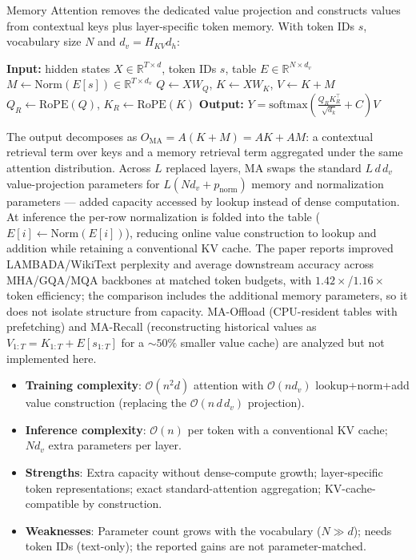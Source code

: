Memory Attention \citep{kang_memory_attention_2026} removes the dedicated value
projection and constructs values from contextual keys plus layer-specific
token memory. With token IDs $s$, vocabulary size $N$ and
$d_v = H_{KV} d_h$:

\begin{algorithmic}[1]
\State \textbf{Input:} hidden states $X \in \mathbb{R}^{T \times d}$, token IDs $s$, table $E \in \mathbb{R}^{N \times d_v}$
\State $M \gets \mathrm{Norm}(E[s]) \in \mathbb{R}^{T \times d_v}$ 
\State $Q \gets X W_Q$, \quad $K \gets X W_K$, \quad $V \gets K + M$ 
\State $Q_R \gets \mathrm{RoPE}(Q)$, \quad $K_R \gets \mathrm{RoPE}(K)$ 
\State \textbf{Output:} $Y = \mathrm{softmax}\!\left(\tfrac{Q_R K_R^\top}{\sqrt{d_k}} + C\right) V$
\end{algorithmic}

The output decomposes as $O_{\mathrm{MA}} = A(K{+}M) = AK + AM$: a contextual
retrieval term over keys and a memory retrieval term aggregated under the same
attention distribution. Across $L$ replaced layers, MA swaps the standard
$L\,d\,d_v$ value-projection parameters for $L(N d_v + p_{\mathrm{norm}})$
memory and normalization parameters --- added capacity accessed by lookup
instead of dense computation. At inference the per-row normalization is folded
into the table ($E[i] \gets \mathrm{Norm}(E[i])$), reducing online value
construction to lookup and addition while retaining a conventional KV cache.
The paper reports improved LAMBADA/WikiText perplexity and average downstream
accuracy across MHA/GQA/MQA backbones at matched token budgets, with
$1.42\times$/$1.16\times$ token efficiency; the comparison includes the
additional memory parameters, so it does not isolate structure from capacity.
MA-Offload (CPU-resident tables with prefetching) and MA-Recall (reconstructing
historical values as $V_{1:T} = K_{1:T} + E[s_{1:T}]$ for a ${\sim}50\%$ smaller
value cache) are analyzed but not implemented here.

\begin{itemize}[leftmargin=*]
    \item \textbf{Training complexity}: $\mathcal{O}(n^2 d)$ attention with
    $\mathcal{O}(n d_v)$ lookup+norm+add value construction (replacing the
    $\mathcal{O}(n\, d\, d_v)$ projection).
    \item \textbf{Inference complexity}: $\mathcal{O}(n)$ per token with a
    conventional KV cache; $N d_v$ extra parameters per layer.
    \item \textbf{Strengths}: Extra capacity without dense-compute growth;
    layer-specific token representations; exact standard-attention aggregation;
    KV-cache-compatible by construction.
    \item \textbf{Weaknesses}: Parameter count grows with the vocabulary
    ($N \gg d$); needs token IDs (text-only); the reported gains are not
    parameter-matched.
\end{itemize}

